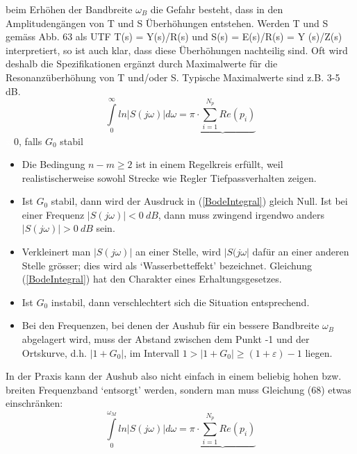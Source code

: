 beim Erhöhen der Bandbreite $\omega_B$
die Gefahr besteht, dass in den Amplitudengängen von T und S Überhöhungen
entstehen. Werden T und S gemäss Abb. 63 als UTF T(s) = Y(s)/R(s) und
S(s) = E(s)/R(s) = Y (s)/Z(s) interpretiert, so ist auch klar, dass diese Überhöhungen
nachteilig sind. Oft wird deshalb die Spezifikationen ergänzt durch Maximalwerte für die Resonanzüberhöhung von
T und/oder S. Typische Maximalwerte sind z.B. 3-5 dB.
\begin{equation}
\int\limits_{0}^{\infty}ln|S(j\omega)|d\omega =\underbrace{\pi\cdot\sum\limits_{i=1}^{N_{p}}Re(p_i)}
\label{BodeIntegral}
\end{equation}
\textcolor{white}{x} \hspace{9.5cm} 0, falls $G_0$ stabil 
\begin{itemize}
	\item Die Bedingung $n-m \geq 2$ ist in einem Regelkreis erfüllt, weil realistischerweise
	sowohl Strecke wie Regler Tiefpassverhalten zeigen.
	\item Ist $G_0$ stabil, dann wird der Ausdruck in (\ref{BodeIntegral}) gleich Null. Ist bei einer Frequenz
	$|S(j\omega)| < 0 \ dB$, dann muss zwingend irgendwo anders $|S(j\omega)| > 0 \ dB$ sein.
	\item Verkleinert man $|S(j\omega)|$ an einer Stelle, wird $|S(j\omega|$ dafür an einer anderen
	Stelle grösser; dies wird als ‘Wasserbetteffekt’ bezeichnet.
	Gleichung (\ref{BodeIntegral}) hat den Charakter eines Erhaltungsgesetzes.
	\item Ist $G_0$ instabil, dann verschlechtert sich die Situation entsprechend.
	\item Bei den Frequenzen, bei denen
	der Aushub für ein bessere Bandbreite $\omega_B$ abgelagert wird, muss der Abstand zwischen dem Punkt -1 und der
	Ortskurve, d.h. $|1 + G_0|$, im Intervall $1 > |1 + G_0| \geq (1 + \varepsilon)-1$ liegen.
\end{itemize}

In der Praxis kann der Aushub also nicht einfach in einem beliebig hohen bzw.
breiten Frequenzband ‘entsorgt’ werden, sondern man muss Gleichung (68) etwas
einschränken:
\begin{equation}
\int\limits_{0}^{\omega_M}ln|S(j\omega)|d\omega =\underbrace{\pi\cdot\sum\limits_{i=1}^{N_{p}}Re(p_i)}
\label{BodeIntegral}
\end{equation}